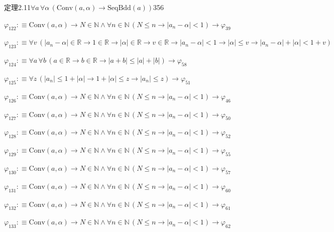 \begin{fullproof}{定理2.11}{$\forall a\,\forall \alpha\,(\mathrm{Conv}(a,\alpha) \to \mathrm{SeqBdd}(a))$}{356}
\begin{abbrevlist}
\item $\varphi_{122} :\equiv \mathrm{Conv}(a,\alpha) \to N \in \mathbb{N} \land \forall n \in \mathbb{N}\,(N \leq n \to \lvert a_{n} - \alpha \rvert < 1) \to \varphi_{39}$
\item $\varphi_{123} :\equiv \forall v\,(\lvert a_{n} - \alpha \rvert \in \mathbb{R} \to 1 \in \mathbb{R} \to \lvert \alpha \rvert \in \mathbb{R} \to v \in \mathbb{R} \to \lvert a_{n} - \alpha \rvert < 1 \to \lvert \alpha \rvert \leq v \to \lvert a_{n} - \alpha \rvert + \lvert \alpha \rvert < 1 + v)$
\item $\varphi_{124} :\equiv \forall a\,\forall b\,(a \in \mathbb{R} \to b \in \mathbb{R} \to \lvert a + b \rvert \leq \lvert a \rvert + \lvert b \rvert) \to \varphi_{58}$
\item $\varphi_{125} :\equiv \forall z\,(\lvert a_{n} \rvert \leq 1 + \lvert \alpha \rvert \to 1 + \lvert \alpha \rvert \leq z \to \lvert a_{n} \rvert \leq z) \to \varphi_{51}$
\item $\varphi_{126} :\equiv \mathrm{Conv}(a,\alpha) \to N \in \mathbb{N} \land \forall n \in \mathbb{N}\,(N \leq n \to \lvert a_{n} - \alpha \rvert < 1) \to \varphi_{46}$
\item $\varphi_{127} :\equiv \mathrm{Conv}(a,\alpha) \to N \in \mathbb{N} \land \forall n \in \mathbb{N}\,(N \leq n \to \lvert a_{n} - \alpha \rvert < 1) \to \varphi_{50}$
\item $\varphi_{128} :\equiv \mathrm{Conv}(a,\alpha) \to N \in \mathbb{N} \land \forall n \in \mathbb{N}\,(N \leq n \to \lvert a_{n} - \alpha \rvert < 1) \to \varphi_{52}$
\item $\varphi_{129} :\equiv \mathrm{Conv}(a,\alpha) \to N \in \mathbb{N} \land \forall n \in \mathbb{N}\,(N \leq n \to \lvert a_{n} - \alpha \rvert < 1) \to \varphi_{55}$
\item $\varphi_{130} :\equiv \mathrm{Conv}(a,\alpha) \to N \in \mathbb{N} \land \forall n \in \mathbb{N}\,(N \leq n \to \lvert a_{n} - \alpha \rvert < 1) \to \varphi_{57}$
\item $\varphi_{131} :\equiv \mathrm{Conv}(a,\alpha) \to N \in \mathbb{N} \land \forall n \in \mathbb{N}\,(N \leq n \to \lvert a_{n} - \alpha \rvert < 1) \to \varphi_{60}$
\item $\varphi_{132} :\equiv \mathrm{Conv}(a,\alpha) \to N \in \mathbb{N} \land \forall n \in \mathbb{N}\,(N \leq n \to \lvert a_{n} - \alpha \rvert < 1) \to \varphi_{61}$
\item $\varphi_{133} :\equiv \mathrm{Conv}(a,\alpha) \to N \in \mathbb{N} \land \forall n \in \mathbb{N}\,(N \leq n \to \lvert a_{n} - \alpha \rvert < 1) \to \varphi_{62}$

\end{abbrevlist}
\end{fullproof}
